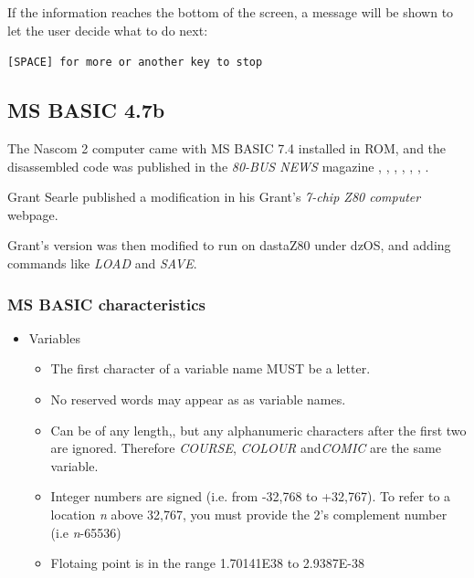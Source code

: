 \documentclass[a4paper,11pt]{article}
\begin{document}
    If the information reaches the bottom of the screen, a message will be shown
    to let the user decide what to do next:

    \hspace{1cm}\texttt{[SPACE] for more or another key to stop}

    \subsection{MS BASIC 4.7b}
    
    The Nascom 2 computer came with MS BASIC 7.4 installed in ROM, and the
    disassembled code was published in the \textit{80-BUS NEWS} magazine
    \cite{80busnews23}, \cite{80busnews24}, \cite{80busnews25},
    \cite{80busnews26}, \cite{80busnews31}, \cite{80busnews32},
    \cite{80busnews33}.

    Grant Searle published a modification in his Grant's \textit{7-chip Z80
    computer} webpage\cite{searle2}.

    Grant's version was then modified to run on dastaZ80 under dzOS, and adding
    commands like \textit{LOAD} and \textit{SAVE}.

    \subsubsection{MS BASIC characteristics}

    \begin{itemize}
        \item Variables
        \begin{itemize}
            \item The first character of a variable name MUST be a letter.
            \item No reserved words may appear as as variable names.
            \item Can be of any length,, but any alphanumeric characters after
            the first two are ignored. Therefore \textit{COURSE},
            \textit{COLOUR} and\textit{COMIC} are the same variable.
            \item Integer numbers are signed (i.e. from -32,768 to +32,767). To
            refer to a location \textit{n} above 32,767, you must provide the
            2's complement number (i.e \textit{n}-65536)
            \item Flotaing point is in the range 1.70141E38 to 2.9387E-38
        \end{itemize}
    \end{itemize}
\end{document}
